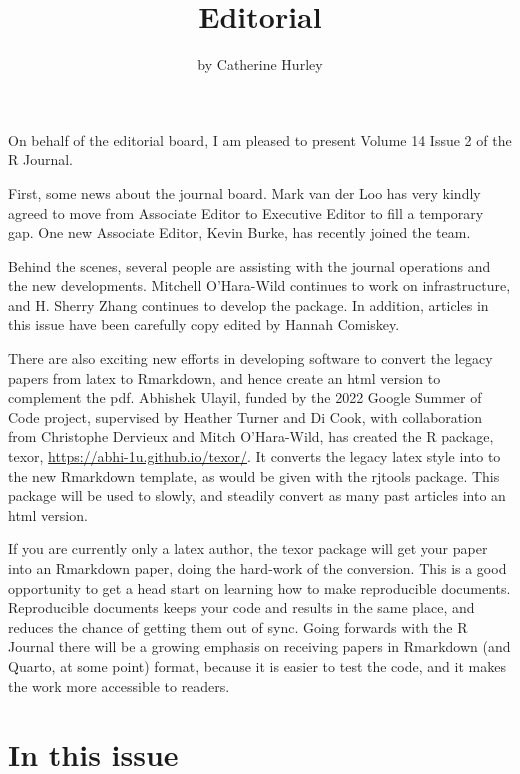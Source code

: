 \title{Editorial}
\author{by Catherine Hurley}

\maketitle


On behalf of the editorial board, I am pleased to present Volume 14 Issue 2 of the R Journal.

First, some news about the journal board. Mark van der Loo has very kindly agreed to move from Associate Editor to Executive Editor to fill a temporary gap. One new Associate Editor, Kevin Burke, has recently joined the team.

Behind the scenes, several people are assisting with the journal operations and the new developments. Mitchell O'Hara-Wild continues to work on infrastructure, and H. Sherry Zhang continues to develop the  package. In addition, articles in this issue have been carefully copy edited by Hannah Comiskey.

There are also exciting new efforts in developing software to convert the legacy papers from latex to Rmarkdown, and hence create an html version to complement the pdf. Abhishek Ulayil, funded by the 2022 Google Summer of Code project, supervised by Heather Turner and Di Cook, with collaboration from Christophe Dervieux and Mitch O'Hara-Wild, has created the R package, texor, \url{https://abhi-1u.github.io/texor/}. It converts the legacy latex style into to the new Rmarkdown template, as would be given with the rjtools package. This package will be used to slowly, and steadily convert as many past articles into an html version.

If you are currently only a latex author, the texor package will get your paper into an Rmarkdown paper, doing the hard-work of the conversion. This is a good opportunity to get a head start on learning how to make reproducible documents. Reproducible documents keeps your code and results in the same place, and reduces the chance of getting them out of sync. Going forwards with the R Journal there will be a growing emphasis on receiving papers in Rmarkdown (and Quarto, at some point) format, because it is easier to test the code, and it makes the work more accessible to readers.

\hypertarget{in-this-issue}{%
\section{In this issue}\label{in-this-issue}}

